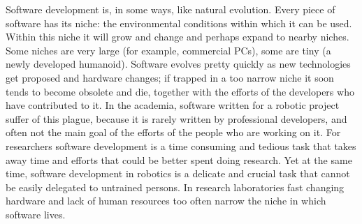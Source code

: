 Software development is, in some ways, like natural 
evolution.  Every piece of software has its niche:
the environmental conditions within which it can be
used.  Within this niche it will grow and change and 
perhaps expand to nearby niches.
Some niches are very large (for example, commercial PCs), some are
tiny (a newly developed humanoid). Software evolves pretty quickly 
as new technologies get proposed and hardware changes; if trapped 
in a too narrow niche it soon tends to become obsolete and die, 
together with the efforts of the developers who have contributed 
to it. In the academia, software written for a robotic 
project suffer of this plague, because it is rarely written 
by professional developers, and often not the main goal of the 
efforts of the people who are working on it. For researchers 
software development is a time consuming and tedious task that 
takes away time and efforts that could be better spent doing 
research. Yet at the same time, software development in 
robotics is a delicate and crucial task that cannot be easily 
delegated to untrained persons. In research laboratories 
fast changing hardware and lack of human resources too often 
narrow the niche in which software lives.

